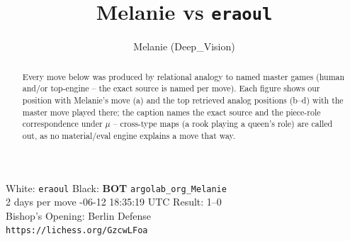 \documentclass[11pt]{article}
\title{Melanie vs \texttt{eraoul}}
\author{Melanie (Deep\_Vision)}
\date{}
\begin{document}
\maketitle
\begin{center}\small
White: \texttt{eraoul} \quad Black: \textbf{BOT} \texttt{argolab\_org\_Melanie} \\
2 days per move -06-12 18:35:19 UTC \quad Result: 1--0 \\
Bishop's Opening: Berlin Defense \\
\texttt{https://lichess.org/GzcwLFoa}
\end{center}
\begin{abstract}Every move below was produced by relational analogy to named master games (human and/or top-engine -- the exact source is named per move). Each figure shows our position with Melanie's move (a) and the top retrieved analog positions (b--d) with the master move played there; the caption names the exact source and the piece-role correspondence under $\mu$ -- cross-type maps (a rook playing a queen's role) are called out, as no material/eval engine explains a move that way.\end{abstract}
\end{document}
